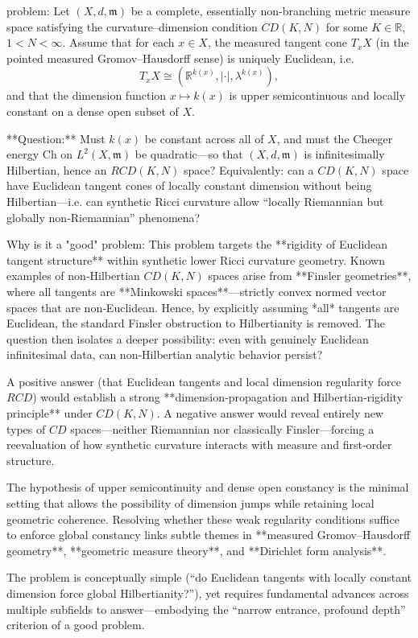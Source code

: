 problem:  
Let \((X,d,\mathfrak{m})\) be a complete, essentially non-branching metric measure space satisfying the curvature–dimension condition \(CD(K,N)\) for some \(K\in\mathbb{R}\), \(1<N<\infty\).  
Assume that for each \(x\in X\), the measured tangent cone \(T_xX\) (in the pointed measured Gromov–Hausdorff sense) is uniquely Euclidean, i.e.  
\[
T_xX \cong (\mathbb{R}^{k(x)},|\cdot|,\lambda^{k(x)}),
\]
and that the dimension function \(x\mapsto k(x)\) is upper semicontinuous and locally constant on a dense open subset of \(X\).  

**Question:**  
Must \(k(x)\) be constant across all of \(X\), and must the Cheeger energy \(\mathrm{Ch}\) on \(L^2(X,\mathfrak{m})\) be quadratic—so that \((X,d,\mathfrak{m})\) is infinitesimally Hilbertian, hence an \(RCD(K,N)\) space?  
Equivalently: can a \(CD(K,N)\) space have Euclidean tangent cones of locally constant dimension without being Hilbertian—i.e. can synthetic Ricci curvature allow “locally Riemannian but globally non‑Riemannian” phenomena?  

Why is it a "good" problem:  
This problem targets the **rigidity of Euclidean tangent structure** within synthetic lower Ricci curvature geometry. Known examples of non‑Hilbertian \(CD(K,N)\) spaces arise from **Finsler geometries**, where all tangents are **Minkowski spaces**—strictly convex normed vector spaces that are non‑Euclidean. Hence, by explicitly assuming *all* tangents are Euclidean, the standard Finsler obstruction to Hilbertianity is removed. The question then isolates a deeper possibility: even with genuinely Euclidean infinitesimal data, can non‑Hilbertian analytic behavior persist?  

A positive answer (that Euclidean tangents and local dimension regularity force \(RCD\)) would establish a strong **dimension‑propagation and Hilbertian‑rigidity principle** under \(CD(K,N)\). A negative answer would reveal entirely new types of \(CD\) spaces—neither Riemannian nor classically Finsler—forcing a reevaluation of how synthetic curvature interacts with measure and first‑order structure.  

The hypothesis of upper semicontinuity and dense open constancy is the minimal setting that allows the possibility of dimension jumps while retaining local geometric coherence. Resolving whether these weak regularity conditions suffice to enforce global constancy links subtle themes in **measured Gromov–Hausdorff geometry**, **geometric measure theory**, and **Dirichlet form analysis**.  

The problem is conceptually simple (“do Euclidean tangents with locally constant dimension force global Hilbertianity?”), yet requires fundamental advances across multiple subfields to answer—embodying the “narrow entrance, profound depth” criterion of a good problem.